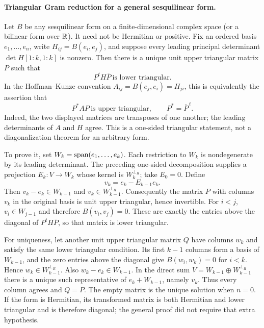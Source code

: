 \documentclass[11pt,a4paper]{book}
\theoremstyle{definition}\newtheorem{definition}[theorem]{Definition}
\theoremstyle{remark}\newtheorem{remark}[theorem]{Remark}
\begin{document}
\paragraph{Triangular Gram reduction for a general sesquilinear form.}
Let $B$ be any sesquilinear form on a finite-dimensional complex space (or a bilinear form over $\mathbb R$). It need not be Hermitian or positive. Fix an ordered basis $e_1,\ldots,e_n$, write $H_{ij}=B(e_i,e_j)$, and suppose every leading principal determinant $\det H[1\!:\!k,1\!:\!k]$ is nonzero. Then there is a unique unit upper triangular matrix $P$ such that
\[P^tH\overline P\ \text{is lower triangular}.
\]
In the Hoffman--Kunze convention $A_{ij}=B(e_j,e_i)=H_{ji}$, this is equivalently the assertion that
\[P^*AP\ \text{is upper triangular},\qquad P^*=\overline P^{\,t}.
\]
Indeed, the two displayed matrices are transposes of one another; the leading determinants of $A$ and $H$ agree. This is a one-sided triangular statement, not a diagonalization theorem for an arbitrary form.

To prove it, set $W_k=\operatorname{span}(e_1,\ldots,e_k)$. Each restriction to $W_k$ is nondegenerate by its leading determinant. The preceding one-sided decomposition supplies a projection $E_k:V\to W_k$ whose kernel is $W_k^{\perp_R}$; take $E_0=0$. Define
\[v_k=e_k-E_{k-1}e_k.
\]
Then $v_k-e_k\in W_{k-1}$ and $v_k\in W_{k-1}^{\perp_R}$. Consequently the matrix $P$ with columns $v_k$ in the original basis is unit upper triangular, hence invertible. For $i<j$, $v_i\in W_{j-1}$ and therefore $B(v_i,v_j)=0$. These are exactly the entries above the diagonal of $P^tH\overline P$, so that matrix is lower triangular.

For uniqueness, let another unit upper triangular matrix $Q$ have columns $w_k$ and satisfy the same lower triangular condition. Its first $k-1$ columns form a basis of $W_{k-1}$, and the zero entries above the diagonal give $B(w_i,w_k)=0$ for $i<k$. Hence $w_k\in W_{k-1}^{\perp_R}$. Also $w_k-e_k\in W_{k-1}$. In the direct sum $V=W_{k-1}\oplus W_{k-1}^{\perp_R}$ there is a unique such representative of $e_k+W_{k-1}$, namely $v_k$. Thus every column agrees and $Q=P$. The empty matrix is the unique solution when $n=0$. If the form is Hermitian, its transformed matrix is both Hermitian and lower triangular and is therefore diagonal; the general proof did not require that extra hypothesis.
\end{document}
